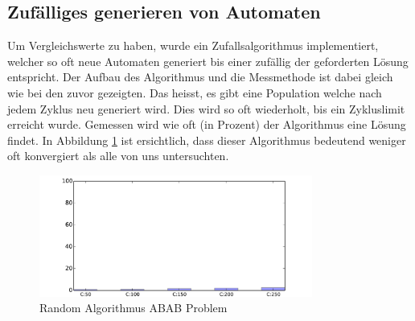 \subsection{Zufälliges generieren von Automaten}
Um Vergleichswerte zu haben, wurde ein Zufallsalgorithmus implementiert, welcher so oft neue Automaten generiert bis einer zufällig der geforderten Lösung entspricht. Der Aufbau des Algorithmus und die Messmethode ist dabei gleich wie bei den zuvor gezeigten. Das heisst, es gibt eine Population welche nach jedem Zyklus neu generiert wird. Dies wird so oft wiederholt, bis ein Zykluslimit erreicht wurde. Gemessen wird wie oft (in Prozent) der Algorithmus eine Lösung findet. In Abbildung \ref{fig:rand_abab} ist ersichtlich, dass dieser Algorithmus bedeutend weniger oft konvergiert als alle von uns untersuchten.

\begin{figure}[h]
  \centering
  \includegraphics[width=0.80\textwidth]{images/RAND_ABAB_RAND_solved.pdf}
  \caption[Random Algorithmus ABAB Problem]{Random Algorithmus ABAB Problem}
  \label{fig:rand_abab}
\end{figure}